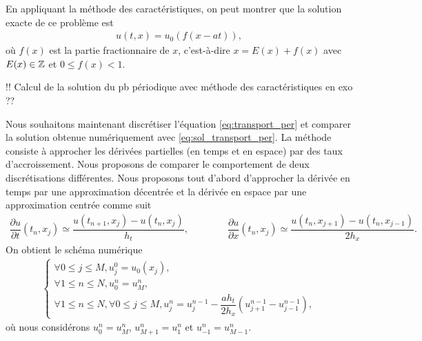 \documentclass[12pt,a4paper,twoside]{article}
\begin{document}
En appliquant la m\'ethode des caract\'eristiques, on peut montrer
que la solution exacte de ce probl\`eme est
\begin{align}
  \label{eq:sol_transport_per}
  u(t,x) = u_0(f(x-at)) ,
\end{align}
o\`u $f(x)$ est la partie fractionnaire de $x$,
c'est-\`a-dire $x = E(x) + f(x)$ avec $E(x) \in \mathbb{Z}$
et $0 \leq f(x) < 1$.


!! Calcul de la solution du pb p\'eriodique avec m\'ethode des caract\'eristiques en exo ??

Nous souhaitons maintenant discr\'etiser l'\'equation
\eqref{eq:transport_per}
et comparer la solution obtenue num\'eriquement avec \eqref{eq:sol_transport_per}.
La m\'ethode consiste \`a approcher les d\'eriv\'ees partielles
(en temps et en espace) par des taux d'accroissement.
Nous proposons de comparer le comportement de deux discr\'etisations diff\'erentes.
Nous proposons tout d'abord d'approcher la d\'eriv\'ee en temps par une
approximation d\'ecentr\'ee et la d\'eriv\'ee en espace par une 
approximation centr\'ee comme suit
\begin{align*}
  \dfrac{\partial u}{\partial t}(t_n,x_j) \simeq \dfrac{u(t_{n+1},x_j) - u(t_n,x_j)}{h_t} ,
  \qquad \qquad 
  \dfrac{\partial u}{\partial x}(t_n,x_j) \simeq \dfrac{u(t_n,x_{j+1}) - u(t_n,x_{j-1})}{2 h_x} .
\end{align*}
On obtient le sch\'ema num\'erique
\begin{align}
  \label{eq:transport_DF_centre}
  \left\{
  \begin{array}{l}
    \forall 0 \leq j \leq M , 
    u_j^0 = u_0(x_j) ,
    \\
    \forall 1 \leq n \leq N, u_0^n = u_M^n ,
    \\
    \forall 1 \leq n \leq N, \forall 0 \leq j \leq M,
    u_j^n = u_j^{n-1} - \dfrac{a h_t}{2 h_x} (u_{j+1}^{n-1} - u_{j-1}^{n-1}) ,
  \end{array}
  \right.
\end{align}
o\`u nous consid\'erons $u_0^n = u_M^n$, $u_{M+1}^n = u_1^n$ et $u_{-1}^n = u_{M-1}^n$.
\end{document}

